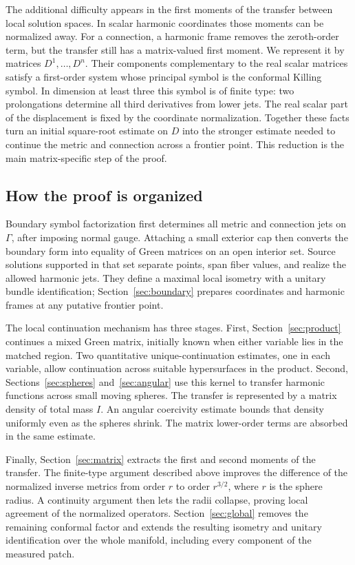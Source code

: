 The additional difficulty appears in the first moments of the transfer
between local solution spaces. In scalar harmonic coordinates those
moments can be normalized away. For a connection, a harmonic frame
removes the zeroth-order term, but the transfer still has a
matrix-valued first moment. We represent it by matrices $D^1,\ldots,D^n$.
Their components complementary to the real scalar matrices satisfy a
first-order system whose principal
symbol is the conformal Killing symbol. In dimension at least three
this symbol is of finite type: two prolongations determine all third
derivatives from lower jets. The real scalar part of the displacement
is fixed by the coordinate normalization. Together these facts turn
an initial square-root estimate on $D$ into the stronger estimate
needed to continue the metric and connection across a frontier point.
This reduction is the main matrix-specific step of the proof.

\subsection{How the proof is organized}
Boundary symbol factorization first determines all metric and
connection jets on $\Gamma$, after imposing normal gauge. Attaching a
small exterior cap then converts the boundary form into equality of
Green matrices on an open interior set. Source solutions supported in
that set separate points, span fiber values, and realize the allowed
harmonic jets. They define a maximal local isometry with a unitary
bundle identification; Section~\ref{sec:boundary} prepares coordinates
and harmonic frames at any putative frontier point.

The local continuation mechanism has three stages. First,
Section~\ref{sec:product} continues a mixed Green matrix, initially
known when either variable lies in the matched region. Two
quantitative unique-continuation estimates, one in each variable,
allow continuation across suitable hypersurfaces in the product.
Second, Sections~\ref{sec:spheres} and~\ref{sec:angular} use this kernel
to transfer harmonic functions across small moving spheres. The
transfer is represented by a matrix density of total mass $I$.
An angular coercivity estimate bounds that density uniformly even as
the spheres shrink. The matrix lower-order terms are absorbed in the
same estimate.

Finally, Section~\ref{sec:matrix} extracts the first and second moments
of the transfer. The finite-type argument described above improves
the difference of the normalized inverse metrics from order $r$ to
order $r^{3/2}$, where $r$ is the sphere radius. A continuity argument
then lets the radii collapse, proving local agreement of the
normalized operators. Section~\ref{sec:global} removes the remaining
conformal factor and extends the resulting isometry and unitary
identification over the whole manifold, including every component of
the measured patch.
